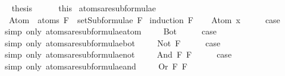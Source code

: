 \begin{isabellebody}
\ \isamarkupfalse%
\ {\isacharquery}thesis\isanewline
\ \ \ \ \isamarkupfalse%
\ this\isanewline
{}\isamarkupfalse%
%
\endisatagproof
{\isafoldproof}%
%
\isadelimproof
\isanewline
%
\endisadelimproof
\isanewline
{}\isamarkupfalse%
\ atoms{\isacharunderscore}are{\isacharunderscore}subformulae{\isacharcolon}\ \isanewline
\ \ {\isachardoublequoteopen}Atom\ {\isacharbackquote}\ atoms\ F\ {\isasymsubseteq}\ setSubformulae\ F{\isachardoublequoteclose}\isanewline
%
\isadelimproof
%
\endisadelimproof
%
\isatagproof
{}\isamarkupfalse%
\ {\isacharparenleft}induction\ F{\isacharparenright}\isanewline
\ \ \isamarkupfalse%
\ {\isacharparenleft}Atom\ x{\isacharparenright}\isanewline
\ \ \isamarkupfalse%
\ \isamarkupfalse%
\ {\isacharquery}case\ \isamarkupfalse%
\ {\isacharparenleft}simp\ only{\isacharcolon}\ atoms{\isacharunderscore}are{\isacharunderscore}subformulae{\isacharunderscore}atom{\isacharparenright}\ \isanewline
{}\isamarkupfalse%
\isanewline
\ \ \isamarkupfalse%
\ Bot\isanewline
\ \ \isamarkupfalse%
\ \isamarkupfalse%
\ {\isacharquery}case\ \isamarkupfalse%
\ {\isacharparenleft}simp\ only{\isacharcolon}\ atoms{\isacharunderscore}are{\isacharunderscore}subformulae{\isacharunderscore}bot{\isacharparenright}\ \isanewline
{}\isamarkupfalse%
\isanewline
\ \ \isamarkupfalse%
\ {\isacharparenleft}Not\ F{\isacharparenright}\isanewline
\ \ \isamarkupfalse%
\ \isamarkupfalse%
\ {\isacharquery}case\ \isamarkupfalse%
\ {\isacharparenleft}simp\ only{\isacharcolon}\ atoms{\isacharunderscore}are{\isacharunderscore}subformulae{\isacharunderscore}not{\isacharparenright}\ \isanewline
{}\isamarkupfalse%
\isanewline
\ \ \isamarkupfalse%
\ {\isacharparenleft}And\ F{}\ F{}{\isacharparenright}\isanewline
\ \ \isamarkupfalse%
\ \isamarkupfalse%
\ {\isacharquery}case\ \isamarkupfalse%
\ {\isacharparenleft}simp\ only{\isacharcolon}\ atoms{\isacharunderscore}are{\isacharunderscore}subformulae{\isacharunderscore}and{\isacharparenright}\ \isanewline
{}\isamarkupfalse%
\isanewline
\ \ \isamarkupfalse%
\ {\isacharparenleft}Or\ F{}\ F{}{\isacharparenright}\isanewline
\ \ \isamarkupfalse%
\ \isamarkupfalse%

\end{isabellebody}
